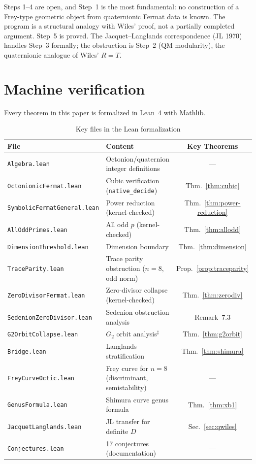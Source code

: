 \documentclass[11pt]{amsart}
\theoremstyle{plain}
\theoremstyle{definition}
\theoremstyle{remark}
\begin{document}
\noindent
Steps 1--4 are open, and Step~1 is the most fundamental:
no construction of a Frey-type geometric object from quaternionic
Fermat data is known. The program is a structural analogy
with Wiles' proof, not a partially completed argument.
Step~5 is proved.
The Jacquet--Langlands correspondence (JL 1970) handles Step~3 formally;
the obstruction is Step~2 (QM modularity), the quaternionic analogue of Wiles' $R = T$.


\section{Machine verification}\label{sec:lean}

Every theorem in this paper is formalized in Lean~4 with Mathlib.

\begin{table}[h]
\centering
\caption{Key files in the Lean formalization}\label{tab:files}
\begin{tabular}{@{}llc@{}}
  \toprule
  File & Content & Key Theorems \\
  \midrule
  \texttt{Algebra.lean} & Octonion/quaternion integer definitions & --- \\
  \texttt{OctonionicFermat.lean} & Cubic verification (\texttt{native\_decide}) & Thm.~\ref{thm:cubic} \\
  \texttt{SymbolicFermatGeneral.lean} & Power reduction (kernel-checked) & Thm.~\ref{thm:power-reduction} \\
  \texttt{AllOddPrimes.lean} & All odd $p$ (kernel-checked) & Thm.~\ref{thm:allodd} \\
  \texttt{DimensionThreshold.lean} & Dimension boundary & Thm.~\ref{thm:dimension} \\
  \texttt{TraceParity.lean} & Trace parity obstruction ($n=8$, odd norm) & Prop.~\ref{prop:traceparity} \\
  \texttt{ZeroDivisorFermat.lean} & Zero-divisor collapse (kernel-checked) & Thm.~\ref{thm:zerodiv} \\
  \texttt{SedenionZeroDivisor.lean} & Sedenion obstruction analysis & Remark~7.3 \\
  \texttt{G2OrbitCollapse.lean} & $G_2$ orbit analysis$^\ddagger$ & Thm.~\ref{thm:g2orbit} \\
  \texttt{Bridge.lean} & Langlands stratification & Thm.~\ref{thm:shimura} \\
  \texttt{FreyCurveOctic.lean} & Frey curve for $n=8$ (discriminant, semistability) & --- \\
  \texttt{GenusFormula.lean} & Shimura curve genus formula & Thm.~\ref{thm:xb1} \\
  \texttt{JacquetLanglands.lean} & JL transfer for definite $D$ & Sec.~\ref{sec:qwiles} \\
  \texttt{Conjectures.lean} & 17 conjectures (documentation) & --- \\
  \bottomrule
\end{tabular}
\end{table}
\end{document}
